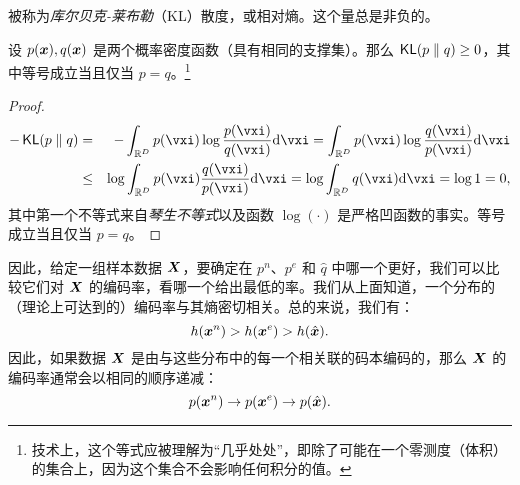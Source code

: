 \documentclass[../../book-main_zh.tex]{subfiles}
\begin{document}
被称为{\em 库尔贝克-莱布勒}（KL）散度，或相对熵。这个量总是非负的。
\begin{theorem}[信息不等式]\label{thm:information-inequality}
	设 $p(\bm{x}), q(\bm{x})$ 是两个概率密度函数（具有相同的支撑集）。那么 $\operatorname{\mathsf{KL}}(p\;\|\; q) \ge 0$，其中等号成立当且仅当 $p = q$。\footnote{技术上，这个等式应被理解为“几乎处处”，即除了可能在一个零测度（体积）的集合上，因为这个集合不会影响任何积分的值。}
\end{theorem}
\begin{proof}
	\begin{eqnarray*}
		- \KL(p\mmid q)
		&=& - \int_{\R^{D}} p(\vxi) \log \frac{p(\vxi)}{q(\vxi)} \odif{\vxi}
		=  \int_{\R^{D}} p(\vxi) \log \frac{q(\vxi)}{p(\vxi)} \odif{\vxi} \\
		&\le& \log \int_{\R^{D}} p(\vxi)  \frac{q(\vxi)}{p(\vxi)} \odif{\vxi} \label{eqn:jensen-KL}
		= \log \int_{\R^{D}} q(\vxi) \odif{\vxi} = \log 1 = 0,
	\end{eqnarray*}
	其中第一个不等式来自{\em 琴生不等式}以及函数 $\log(\cdot)$ 是严格凹函数的事实。等号成立当且仅当 $p = q$。
\end{proof}

因此，给定一组样本数据 $\bm{X}$，要确定在 $p^{n}$、$p^{e}$ 和 $\hat{q}$ 中哪一个更好，我们可以比较它们对 $\bm{X}$ 的编码率，看哪一个给出最低的率。我们从上面知道，一个分布的（理论上可达到的）编码率与其熵密切相关。总的来说，我们有：
\begin{equation}
	h(\bm{x}^n) > h(\bm{x}^e) > h(\hat {\bm{x}}).
\end{equation}
因此，如果数据 $\bm{X}$ 是由与这些分布中的每一个相关联的码本编码的，那么 $\bm{X}$ 的编码率通常会以相同的顺序递减：
\begin{equation}
	p(\bm{x}^n) \rightarrow p(\bm{x}^e) \rightarrow p(\hat {\bm{x}}).
\end{equation}
\end{document}
